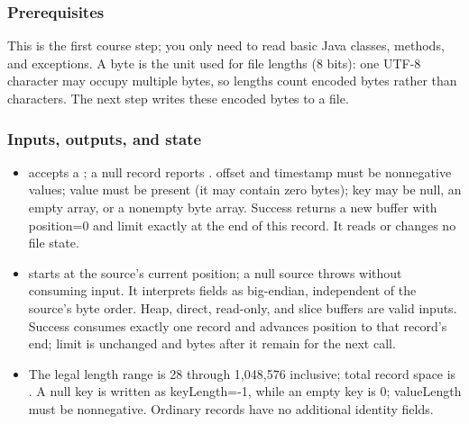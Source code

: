 \subsubsection*{Prerequisites}
This is the first course step; you only need to read basic Java classes, methods, and exceptions. A byte is the unit used for file lengths (8 bits): one UTF-8 character may occupy multiple bytes, so lengths count encoded bytes rather than characters. The next step writes these encoded bytes to a file.
\subsubsection*{Inputs, outputs, and state}
\begin{itemize}
\item {} accepts a ; a null record reports . offset and timestamp must be nonnegative  values; value must be present (it may contain zero bytes); key may be null, an empty array, or a nonempty byte array. Success returns a new buffer with position=0 and limit exactly at the end of this record. It reads or changes no file state.
\item {} starts at the source's current position; a null source throws  without consuming input. It interprets fields as big-endian, independent of the source's byte order. Heap, direct, read-only, and slice buffers are valid inputs. Success consumes exactly one record and advances position to that record's end; limit is unchanged and bytes after it remain for the next call.
\item The legal length range is 28 through 1,048,576 inclusive; total record space is . A null key is written as keyLength=-1, while an empty key is 0; valueLength must be nonnegative. Ordinary records have no additional identity fields.
\end{itemize}
